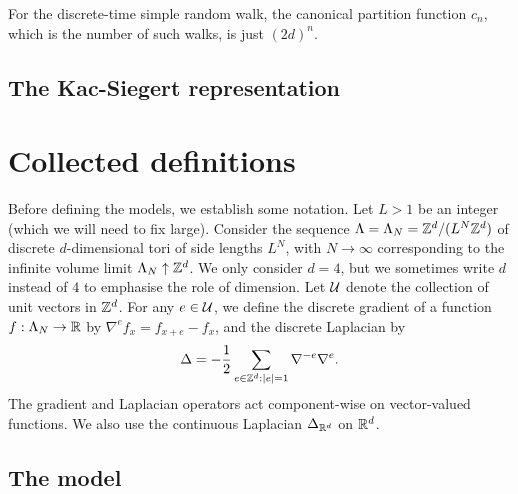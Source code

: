 
For the discrete-time simple random walk, the canonical partition function $c_n$,
which is the number of such walks, is just $(2 d)^n$.


\subsection{The Kac-Siegert representation}




\pagebreak

\section{Collected definitions}

Before defining the models, we establish some notation.
Let $L > 1$ be an integer (which we will need to fix large).
Consider the sequence $\Lambda=\Lambda_N = {\mathbb Z}^d/(L^N{\mathbb Z}^d)$ of
discrete $d$-dimensional tori of side lengths $L^N$,
with $N \to \infty$ corresponding to the infinite volume limit $\Lambda_N \uparrow {\mathbb Z}^d$.
We only consider $d=4$, but we sometimes write $d$ instead of $4$
to emphasise the role of dimension.
Let $\mathcal{U}$ denote the collection of unit vectors in ${ {{\mathbb Z}}^d }$. %
For any $e \in \mathcal{U}$, %
we define the discrete gradient of a function $f:\Lambda_N \rightarrow {\mathbb R}$
by $\nabla^e f_x = f_{x + e} - f_x$, and
the discrete Laplacian by
\begin{equation}
\label{e:DeltaLambda}
\Delta = -\frac{1}{2}\sum_{e\in{\mathbb Z}^d:|e| = 1}\nabla^{-e} \nabla^{e}.
\end{equation}
The gradient and Laplacian operators act component-wise on vector-valued functions.
We also use the
continuous Laplacian $\Delta_{{ {{\mathbb R}}^d}}$ on ${ {{\mathbb R}}^d}$.

\subsection{The \texorpdfstring{\phifour}{phi4} model}

